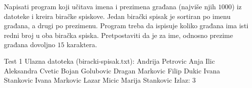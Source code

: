 \begin{Answer}[ref=508]
\end{Answer}
\begin{Exercise}[label=509]
  Napisati program koji učitava imena i prezimena građana (najviše
  njih $1000$) iz datoteke  i kreira
  biračke spiskove. Jedan birački spisak je sortiran po imenu građana,
  a drugi po prezimenu. Program treba da ispisuje koliko građana ima
  isti redni broj u oba biračka spiska. Pretpostaviti da je za ime,
  odnosno prezime građana dovoljno $15$ karaktera.

\begin{maxitest}
\begin{test}{Test 1}
Ulazna datoteka (biracki-spisak.txt):
  Andrija Petrovic
  Anja Ilic
  Aleksandra Cvetic
  Bojan Golubovic
  Dragan Markovic
  Filip Dukic
  Ivana Stankovic
  Ivana Markovic
  Lazar Micic
  Marija Stankovic
Izlaz: 3
\end{test}
\end{maxitest}
  
\end{Exercise}

